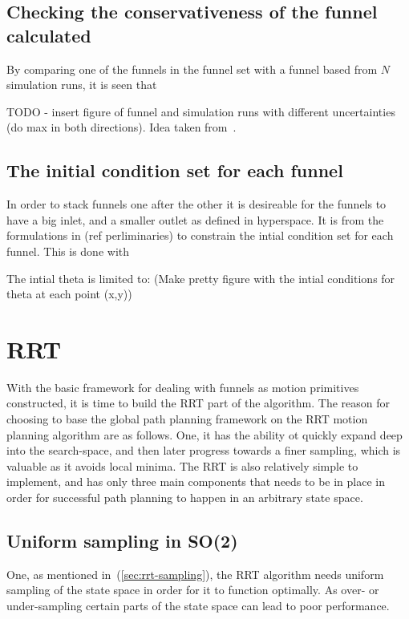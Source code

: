 \subsection{Checking the conservativeness of the funnel calculated}

By comparing one of the funnels in the funnel set with a funnel based from \(N\)
simulation runs, it is seen that

TODO - insert figure of funnel and simulation runs with different uncertainties
(do max in both directions).
Idea taken from~\cite{mooreControlSynthesisVerification2012}.

\subsection{The initial condition set for each funnel}

In order to stack funnels one after the other it is desireable for the funnels
to have a big inlet, and a smaller outlet as defined in hyperspace. It is from
the formulations in (ref perliminaries) to constrain the intial condition set
for each funnel. This is done with

The intial theta is limited to: (Make pretty figure with the intial conditions
for theta at each point (x,y))

\section{RRT}

With the basic framework for dealing with funnels as motion primitives
constructed, it is time to build the \ac{RRT} part of the \rrtfunnel{}
algorithm. The reason for choosing to base the global path planning framework on
the \ac{RRT} motion planning algorithm are as follows. One, it has the ability
ot quickly expand deep into the search-space, and then later progress towards a
finer sampling, which is valuable as it avoids local minima. The \ac{RRT} is
also relatively simple to implement, and has only three main components that
needs to be in place in order for successful path planning to happen in an
arbitrary state space.

\subsection{Uniform sampling in SO(2)}

One, as mentioned in~(\ref{sec:rrt-sampling}), the \ac{RRT} algorithm needs
uniform sampling of the state space in order for it to function optimally. As
over- or under-sampling certain parts of the state space can lead to poor
performance.

